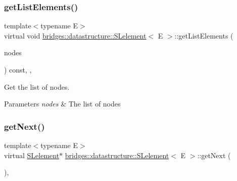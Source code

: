 \mbox{\label{classbridges_1_1datastructure_1_1_s_lelement_a81b68786cb93fe0f7edb48af789535a5}} 
\subsubsection{\texorpdfstring{get\+List\+Elements()}{getListElements()}}
{\footnotesize\ttfamily template$<$typename E$>$ \\
virtual void \hyperlink{classbridges_1_1datastructure_1_1_s_lelement}{bridges\+::datastructure\+::\+S\+Lelement}$<$ E $>$\+::get\+List\+Elements (\begin{DoxyParamCaption}\item[{vector$<$ const \hyperlink{classbridges_1_1datastructure_1_1_s_lelement}{S\+Lelement}$<$ E $>$ $\ast$$>$ \&}]{nodes }\end{DoxyParamCaption}) const\hspace{0.3cm}{\ttfamily [inline]}, {\ttfamily [protected]}, {\ttfamily [virtual]}}



Get the list of nodes. 


\begin{DoxyParams}{Parameters}
{\em nodes} & The list of nodes \\
\hline
\end{DoxyParams}
\mbox{\label{classbridges_1_1datastructure_1_1_s_lelement_ae43dd771d9ced7cb17f1d35f34cd9a42}} 
\subsubsection{\texorpdfstring{get\+Next()}{getNext()}\hspace{0.1cm}{\footnotesize\ttfamily [1/2]}}
{\footnotesize\ttfamily template$<$typename E$>$ \\
virtual \hyperlink{classbridges_1_1datastructure_1_1_s_lelement}{S\+Lelement}$\ast$ \hyperlink{classbridges_1_1datastructure_1_1_s_lelement}{bridges\+::datastructure\+::\+S\+Lelement}$<$ E $>$\+::get\+Next (\begin{DoxyParamCaption}{ }\end{DoxyParamCaption})\hspace{0.3cm}{\ttfamily [inline]}, {\ttfamily [virtual]}}



